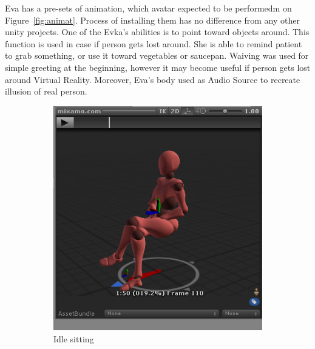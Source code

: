 \documentclass[18pt]{article}
\numberwithin{equation}{section} %
\numberwithin{figure}{section} %
\numberwithin{table}{section} %
\begin{document}
	Eva has a pre-sets of animation, which avatar expected to be performedm on Figure~\ref{fig:animat}. Process of installing them has no difference from any other unity projects. One of the Evka's abilities is to point toward objects around. This function is used in case if person gets lost around. She is able to remind patient to grab something, or use it toward vegetables or saucepan. Waiving was used for simple greeting at the beginning, however it may become useful if person gets lost around Virtual Reality. Moreover, Eva's body used as Audio Source to recreate illusion of real person. \\
	\begin{figure}[H]
		\centering
		\begin{subfigure}{0.2\textwidth}
			\centering
			\includegraphics[width=1\linewidth]{images/sit}
			\caption{Idle sitting}
		\end{subfigure}
		\begin{subfigure}{0.2\textwidth}
			\centering

\end{subfigure}
\end{figure}
\end{document}
